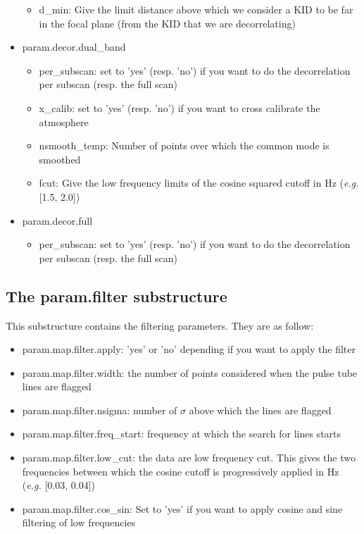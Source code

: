 \documentclass[a4paper]{article}
\begin{document}
\begin{itemize}
\begin{itemize}
	\item {\color{blue} d\_min}: Give the limit distance above which we consider a KID to be far in the focal plane (from the KID that we are decorrelating)
	\end{itemize}
\item {\color{blue} param.decor.dual\_band}
	\begin{itemize}
	\item {\color{blue} per\_subscan}: set to 'yes' (resp. 'no') if you want to do the decorrelation per subscan (resp. the full scan)
        \item {\color{blue} x\_calib}: set to 'yes' (resp. 'no') if you want to cross calibrate the atmosphere
        \item {\color{blue} nsmooth\_temp}: Number of points over which the common mode is smoothed
        \item {\color{blue} fcut}: Give the low frequency limits of the cosine squared cutoff in Hz ({\it e.g.} [1.5, 2.0])
	\end{itemize}
\item {\color{blue} param.decor.full}
	\begin{itemize}
	\item {\color{blue} per\_subscan}: set to 'yes' (resp. 'no') if you want to do the decorrelation per subscan (resp. the full scan)
	\end{itemize}
\end{itemize}

\subsection{The param.filter substructure }
\label{sec:param_filter}
This substructure contains the filtering parameters. They are as follow:
\begin{itemize}
 \item {\color{blue} param.map.filter.apply}: 'yes' or 'no' depending if you want to apply the filter
 \item {\color{blue} param.map.filter.width}: the number of points considered when the pulse tube lines are flagged
 \item {\color{blue} param.map.filter.nsigma}: number of $\sigma$ above which the lines are flagged
 \item {\color{blue} param.map.filter.freq\_start}: frequency at which the search for lines starts
 \item {\color{blue} param.map.filter.low\_cut}: the data are low frequency cut. This gives the two frequencies between which the cosine cutoff is progressively applied in Hz ({\it e.g.} [0.03, 0.04])
 \item {\color{blue} param.map.filter.cos\_sin}: Set to 'yes' if you want to apply cosine and sine filtering of low frequencies
\end{itemize}
\end{document}
